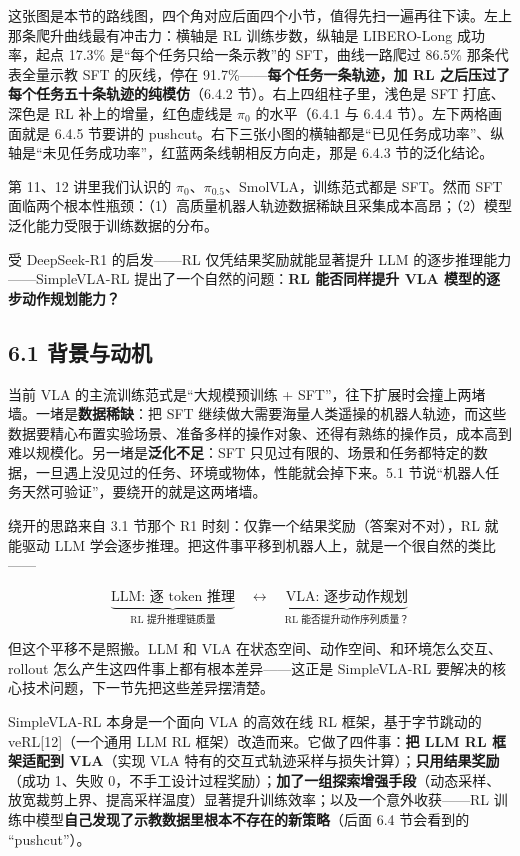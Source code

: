 \documentclass[
  chinese,
]{ctexart}
\begin{document}
这张图是本节的路线图，四个角对应后面四个小节，值得先扫一遍再往下读。左上那条爬升曲线最有冲击力：横轴是
RL 训练步数，纵轴是 LIBERO-Long 成功率，起点 17.3\%
是``每个任务只给一条示教''的 SFT，曲线一路爬过 86.5\% 那条代表全量示教
SFT 的灰线，停在 91.7\%------\textbf{每个任务一条轨迹，加 RL
之后压过了每个任务五十条轨迹的纯模仿}（6.4.2
节）。右上四组柱子里，浅色是 SFT 打底、深色是 RL 补上的增量，红色虚线是
\(\pi_0\) 的水平（6.4.1 与 6.4.4 节）。左下两格画面就是 6.4.5 节要讲的
pushcut。右下三张小图的横轴都是``已见任务成功率''、纵轴是``未见任务成功率''，红蓝两条线朝相反方向走，那是
6.4.3 节的泛化结论。

第 11、12 讲里我们认识的 \(\pi_0\)、\(\pi_{0.5}\)、SmolVLA，训练范式都是
SFT。然而 SFT
面临两个根本性瓶颈：（1）高质量机器人轨迹数据稀缺且采集成本高昂；（2）模型泛化能力受限于训练数据的分布。

受 DeepSeek-R1 的启发------RL 仅凭结果奖励就能显著提升 LLM
的逐步推理能力------SimpleVLA-RL 提出了一个自然的问题：\textbf{RL
能否同样提升 VLA 模型的逐步动作规划能力？}

\subsection{6.1 背景与动机}\label{ux80ccux666fux4e0eux52a8ux673a}

当前 VLA 的主流训练范式是``大规模预训练 +
SFT''，往下扩展时会撞上两堵墙。一堵是\textbf{数据稀缺}：把 SFT
继续做大需要海量人类遥操的机器人轨迹，而这些数据要精心布置实验场景、准备多样的操作对象、还得有熟练的操作员，成本高到难以规模化。另一堵是\textbf{泛化不足}：SFT
只见过有限的、场景和任务都特定的数据，一旦遇上没见过的任务、环境或物体，性能就会掉下来。5.1
节说``机器人任务天然可验证''，要绕开的就是这两堵墙。

绕开的思路来自 3.1 节那个 R1 时刻：仅靠一个结果奖励（答案对不对），RL
就能驱动 LLM
学会逐步推理。把这件事平移到机器人上，就是一个很自然的类比------

\[
\underbrace{\text{LLM: 逐 token 推理}}_{\text{RL 提升推理链质量}} \quad \longleftrightarrow \quad \underbrace{\text{VLA: 逐步动作规划}}_{\text{RL 能否提升动作序列质量？}}
\]

但这个平移不是照搬。LLM 和 VLA
在状态空间、动作空间、和环境怎么交互、rollout
怎么产生这四件事上都有根本差异------这正是 SimpleVLA-RL
要解决的核心技术问题，下一节先把这些差异摆清楚。

SimpleVLA-RL 本身是一个面向 VLA 的高效在线 RL 框架，基于字节跳动的
veRL{[}12{]}（一个通用 LLM RL 框架）改造而来。它做了四件事：\textbf{把
LLM RL 框架适配到 VLA}（实现 VLA
特有的交互式轨迹采样与损失计算）；\textbf{只用结果奖励}（成功 1、失败
0，不手工设计过程奖励）；\textbf{加了一组探索增强手段}（动态采样、放宽裁剪上界、提高采样温度）显著提升训练效率；以及一个意外收获------RL
训练中模型\textbf{自己发现了示教数据里根本不存在的新策略}（后面 6.4
节会看到的 ``pushcut''）。
\end{document}
